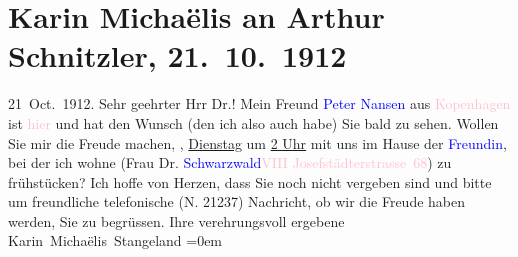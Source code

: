 

               \section[Karin Michaëlis an Arthur Schnitzler, 21. 10. 1912]{ Karin Michaëlis an Arthur Schnitzler, 21. 10. 1912}\nopagebreak{}\rehead{ }\normalsize\beginnumbering{} \toendnotes[C]{\smallbreak\pagebreak[2]} 
\toendnotes[C]{\smallbreak}\pstart
           \centering{}{\pb}21 Oct. 1912.\pend
           \pstart\center{}Sehr geehrter Hrr Dr.!\pend\pstart
           Mein Freund \textcolor{blue}{Peter Nansen}{}\ledrightnote{\textcolor{blue}{Peter Nansen}} aus \textcolor{pink}{Kopenhagen}{}\ledrightnote{\textcolor{pink}{Kopenhagen}} ist \textcolor{pink}{hier}{} und hat den Wunsch (den ich also auch habe) Sie bald zu sehen.\pend
           \pstart
           Wollen Sie mir die Freude machen, \label{K_L02582-1v}\label{K_L02582-1h}, \uline{Dienstag} um \uline{2 Uhr} mit uns im Hause der \textcolor{blue}{Freundin}{}, bei der ich wohne (Frau Dr. \textcolor{blue}{Schwarzwald}{}\ledrightnote{\textcolor{blue}{Eugenie Schwarzwald}}{ }\textcolor{pink}{VIII Josefstädterstrasse 68}{}\ledrightnote{\textcolor{pink}{Josefstädter Straße}}) zu
               frühstücken?\pend
           \pstart
           {\pb}Ich hoffe von Herzen, dass Sie noch nicht vergeben sind
               und bitte um freundliche telefonische (N. 21237)  Nachricht, ob wir die Freude haben werden, Sie zu
               begrüssen.\pend
           \pstart
           Ihre verehrungsvoll ergebene{\\[\baselineskip]}\spacefill\mbox{Karin Michaëlis
               Stangeland}\pend
           \leftskip=0em{}\endnumbering{}  
      